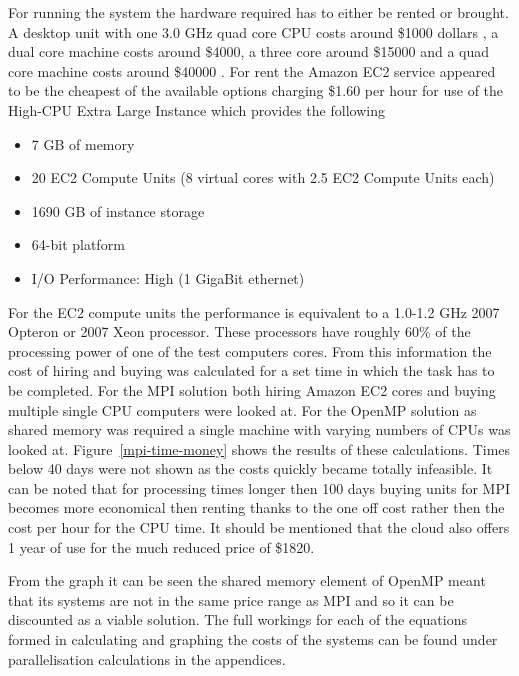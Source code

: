 For running the system the hardware required has to either be rented or brought. A desktop unit with  one 3.0 GHz quad core CPU costs around \$1000 dollars \cite{price}, a dual core machine costs around \$4000, a three core around \$15000 and a quad core machine costs around \$40000 \cite{price}. For rent the Amazon EC2 service \cite{ec2} appeared to be the cheapest of the available options charging \$1.60 per hour for use of the High-CPU Extra Large Instance which provides the following 

\begin{itemize}
\item 7 GB of memory
\item 20 EC2 Compute Units (8 virtual cores with 2.5 EC2 Compute Units each)
\item 1690 GB of instance storage
\item 64-bit platform
\item I/O Performance: High (1 GigaBit ethernet)
\end{itemize}

For the EC2 compute units the performance is equivalent to a 1.0-1.2 GHz 2007 Opteron or 2007 Xeon processor. These processors have roughly 60\% of the processing power of one of the test computers cores. From this information the cost of hiring and buying was calculated for a set time in which the task has to be completed. For the MPI solution both hiring Amazon EC2 cores and buying multiple single CPU computers were looked at. For the OpenMP solution as shared memory was required a single machine with varying numbers of CPUs was looked at. Figure~\ref{mpi-time-money} shows the results of these calculations. Times below 40 days were not shown as the costs quickly became totally infeasible. It can be noted that for processing times longer then 100 days buying units for MPI becomes more economical then renting thanks to the one off cost rather then the cost per hour for the CPU time. It should be mentioned that the cloud also offers 1 year of use for the much reduced price of \$1820.

From the graph it can be seen the shared memory element of OpenMP meant that its systems are not in the same price range as MPI and so it can be discounted as a viable solution. The full workings for each of the equations formed in calculating and graphing the costs of the systems can be found under parallelisation calculations in the appendices.

